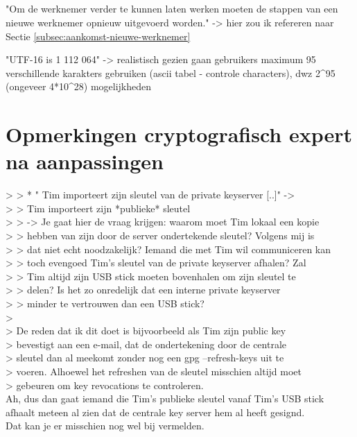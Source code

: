 \subsection{}
"Om de werknemer verder te kunnen laten werken moeten de stappen van een
nieuwe werknemer opnieuw uitgevoerd worden." -> hier zou ik refereren naar
Sectie \ref{subsec:aankomst-nieuwe-werknemer}

"UTF-16 is 1 112 064" -> realistisch gezien gaan gebruikers maximum 95
verschillende karakters gebruiken (ascii tabel - controle characters), dwz
2\textasciicircum95 (ongeveer 4*10\textasciicircum28) mogelijkheden

\section{Opmerkingen cryptografisch expert na aanpassingen}

> > * " Tim importeert zijn sleutel van de private keyserver [..]" -> \\
> > Tim importeert zijn *publieke* sleutel \\
> > -> Je gaat hier de vraag krijgen: waarom moet Tim lokaal een kopie \\
> > hebben van zijn door de server ondertekende sleutel? Volgens mij is \\
> > dat niet echt noodzakelijk? Iemand die met Tim wil communiceren kan \\
> > toch evengoed Tim's sleutel van de private keyserver afhalen? Zal \\
> > Tim altijd zijn USB stick moeten bovenhalen om zijn sleutel te \\
> > delen? Is het zo onredelijk dat een interne private keyserver \\
> > minder te vertrouwen dan een USB stick? \\
> \\
> De reden dat ik dit doet is bijvoorbeeld als Tim zijn public key \\
> bevestigt aan een e-mail, dat de ondertekening door de centrale \\
> sleutel dan al meekomt zonder nog een gpg --refresh-keys uit te \\
> voeren. Alhoewel het refreshen van de sleutel misschien altijd moet \\
> gebeuren om key revocations te controleren. \\

Ah, dus dan gaat iemand die Tim's publieke sleutel vanaf Tim's USB stick \\
afhaalt meteen al zien dat de centrale key server hem al heeft gesignd. \\
Dat kan je er misschien nog wel bij vermelden. \\

